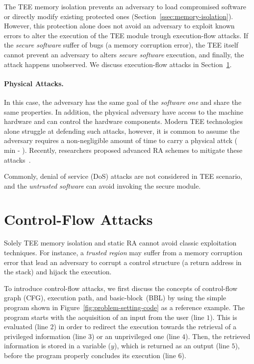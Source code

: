 The TEE memory isolation prevents an adversary to load compromised software or 
directly modify existing protected ones (Section~\ref{ssec:memory-isolation}).
However, this protection alone does not avoid an adversary to exploit known 
errors to alter the execution of the TEE module trough execution-flow 
attacks.
If the \emph{secure software} suffer of bugs (\eg a memory corruption error), 
the TEE itself cannot prevent an adversary to alters \emph{secure software} 
execution, and finally, the attack happens unobserved.
We discuss execution-flow attacks in Section~\ref{sec:control-flow-attacks}.

\paragraph{Physical Attacks.}
In this case, the adversary has the same goal of the \emph{software 
one} and share the same properties. In addition, the physical adversary have 
access to the machine hardware and can control the hardware components.
Modern TEE technologies alone struggle at defending such attacks, however, it 
is common to assume the adversary requires a non-negligible amount of time to 
carry a physical attck ( min - 
\cite{conti2010smallville,conti2008emergent,darpa,ibrahim2017seed,pasta,us-aid}).
Recently, researchers proposed advanced RA schemes to mitigate these 
attacks~\citep{darpa,visintin2019safe,pasta}.

\vspace{0.5cm}
\noindent 
Commonly, denial of service (DoS) attacks are not considered in 
TEE scenario, and the \emph{untrusted software} can avoid invoking the secure 
module.

\section{Control-Flow Attacks}
\label{sec:control-flow-attacks}

Solely TEE memory isolation and static RA cannot avoid classic exploitation 
techniques.
For instance, a \emph{trusted region} may suffer from a memory corruption 
error that lead an adversary to corrupt a control structure (\ie a return 
address in the stack) and hijack the execution.

To introduce control-flow attacks, we first discuss the concepts of 
control-flow graph (CFG), execution path, and basic-block~(BBL) by using the 
simple program shown in Figure~\ref{fig:problem-setting-code} as a reference 
example. 
The program starts with the acquisition of an input from the user (line $1$). 
This is evaluated (line $2$) in order to redirect the execution towards the 
retrieval of a privileged information (line $3$) or an unprivileged one (line 
$4$). Then, the retrieved information is stored in a variable ($y$), which is 
returned as an output (line $5$), before the program properly concludes its 
execution (line $6$). 

